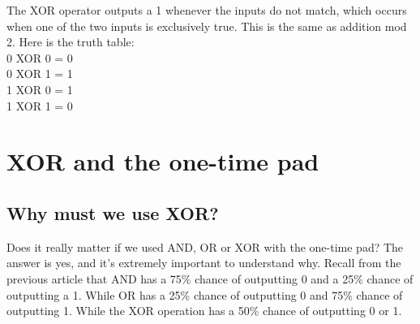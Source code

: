 \documentclass{report}
\begin{document}
The XOR operator outputs a 1 whenever the inputs do not match, which occurs when one of the two inputs is exclusively true. This is the same as addition mod 2. Here is the truth table:\\
0 XOR 0 = 0\\
0 XOR 1 = 1\\
1 XOR 0 = 1\\
1 XOR 1 = 0\\
\newpage

\section{XOR and the one-time pad}

\subsection{Why must we use XOR?}
Does it really matter if we used AND, OR or XOR with the one-time pad? The answer is yes, and it’s extremely important to understand why. Recall from the previous article that AND has a 75\% chance of outputting 0 and a 25\% chance of outputting a 1. While OR has a 25\% chance of outputting 0 and 75\% chance of outputting 1. While the XOR operation has a 50\% chance of outputting 0 or 1.
\end{document}
